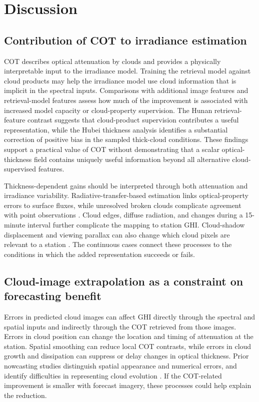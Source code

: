 \documentclass[11pt]{article}
\begin{document}
\FloatBarrier
\section{Discussion}
\subsection{Contribution of COT to irradiance estimation}
COT describes optical attenuation by clouds and provides a physically interpretable input to the irradiance model. Training the retrieval model against cloud products may help the irradiance model use cloud information that is implicit in the spectral inputs. Comparisons with additional image features and retrieval-model features assess how much of the improvement is associated with increased model capacity or cloud-property supervision. The Hunan retrieval-feature contrast suggests that cloud-product supervision contributes a useful representation, while the Hubei thickness analysis identifies a substantial correction of positive bias in the sampled thick-cloud conditions. These findings support a practical value of COT without demonstrating that a scalar optical-thickness field contains uniquely useful information beyond all alternative cloud-supervised features.

Thickness-dependent gains should be interpreted through both attenuation and irradiance variability. Radiative-transfer-based estimation links optical-property errors to surface fluxes, while unresolved broken clouds complicate agreement with point observations \cite{takenaka2011}. Cloud edges, diffuse radiation, and changes during a 15-minute interval further complicate the mapping to station GHI. Cloud-shadow displacement and viewing parallax can also change which cloud pixels are relevant to a station \cite{miller2018,wiltink2025}. The continuous cases connect these processes to the conditions in which the added representation succeeds or fails.

\subsection{Cloud-image extrapolation as a constraint on forecasting benefit}
Errors in predicted cloud images can affect GHI directly through the spectral and spatial inputs and indirectly through the COT retrieved from those images. Errors in cloud position can change the location and timing of attenuation at the station. Spatial smoothing can reduce local COT contrasts, while errors in cloud growth and dissipation can suppress or delay changes in optical thickness. Prior nowcasting studies distinguish spatial appearance and numerical errors, and identify difficulties in representing cloud evolution \cite{chen2024,cui2024}. If the COT-related improvement is smaller with forecast imagery, these processes could help explain the reduction.
\end{document}
